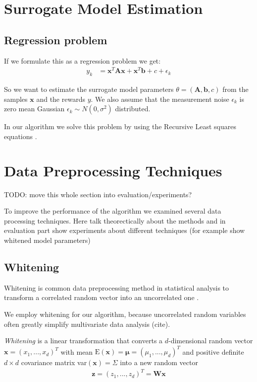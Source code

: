 \section{Surrogate Model Estimation}

\subsection{Regression problem}

If we formulate this as a regression problem we get:
\begin{align*}
  y_k &=  \mathbf{x}^T \mathbf{A} \mathbf{x} + \mathbf{x}^T \mathbf{b} + c + \epsilon_k
\end{align*}

So we want to estimate the surrogate model parameters $\theta = (\mathbf{A}, \mathbf{b}, c)$ from the samples $\mathbf{x}$
and the rewards $y$. We also assume that
the measurement noise $\epsilon_k$ is zero mean Gaussian $\epsilon_k \sim N(0, \sigma^2)$ distributed.

In our algorithm we solve this problem by using the Recursive Least squares equations .

\section{Data Preprocessing Techniques}
TODO: move this whole section into evaluation/experiments?

To improve the performance of the algorithm we examined several data processing techniques.
Here talk theorectically about the methods and in evaluation part
show experiments about different techniques (for example show whitened model
parameters)

\subsection{Whitening}
Whitening is common data preprocessing method in statistical analysis
to transform a correlated random vector into an uncorrelated one
\citet{kessy2018optimal}.

We employ whitening for our algorithm, because uncorrelated
random variables often greatly simplify  multivariate data analysis (cite).

\textit{Whitening} is a linear transformation that converts a $d$-dimensional
random vector $\mathbf{x} = (x_1,...,x_d)^T$ with mean
$\text{E}(\mathbf{x}) = \mathbf{\mu} = (\mu_1,...,\mu_d)^T$ and
positive definite $d \times d$ covariance matrix
var$(\mathbf{x}) = \Sigma$ into a new random vector
\begin{align}
  \label{whitening}
 \mathbf{z} = (z_1,...,z_d)^T = \mathbf{W}\mathbf{x}
\end{align}

